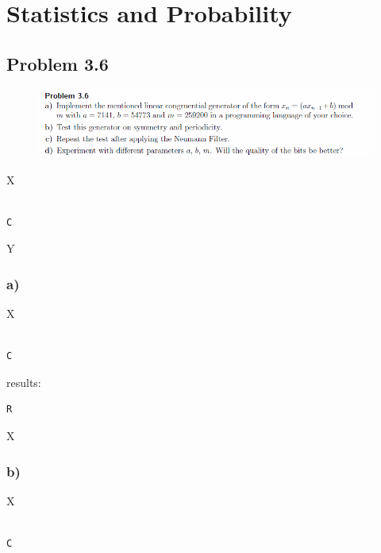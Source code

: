 \section{Statistics and Probability}


\subsection{Problem 3.6}


\begin{figure}[!ht]
\includegraphics[width=1\textwidth]{chapters/images/desc-3-6}
\end{figure}


X

\begin{lstlisting}[caption=todo]

C

\end{lstlisting}

Y


\subsubsection{a)}

X

\begin{lstlisting}[caption=todo]

C

\end{lstlisting}


results:

\begin{lstlisting}[caption=Result of 1.1 a), keywordstyle=\color{black}]
R
\end{lstlisting}

X



\subsubsection{b)}

X

\begin{lstlisting}[caption=todo]

C

\end{lstlisting}



